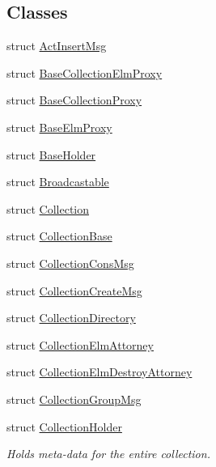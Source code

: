 \subsection*{Classes}
\begin{DoxyCompactItemize}
\item 
struct \hyperlink{structvt_1_1vrt_1_1collection_1_1_act_insert_msg}{Act\+Insert\+Msg}
\item 
struct \hyperlink{structvt_1_1vrt_1_1collection_1_1_base_collection_elm_proxy}{Base\+Collection\+Elm\+Proxy}
\item 
struct \hyperlink{structvt_1_1vrt_1_1collection_1_1_base_collection_proxy}{Base\+Collection\+Proxy}
\item 
struct \hyperlink{structvt_1_1vrt_1_1collection_1_1_base_elm_proxy}{Base\+Elm\+Proxy}
\item 
struct \hyperlink{structvt_1_1vrt_1_1collection_1_1_base_holder}{Base\+Holder}
\item 
struct \hyperlink{structvt_1_1vrt_1_1collection_1_1_broadcastable}{Broadcastable}
\item 
struct \hyperlink{structvt_1_1vrt_1_1collection_1_1_collection}{Collection}
\item 
struct \hyperlink{structvt_1_1vrt_1_1collection_1_1_collection_base}{Collection\+Base}
\item 
struct \hyperlink{structvt_1_1vrt_1_1collection_1_1_collection_cons_msg}{Collection\+Cons\+Msg}
\item 
struct \hyperlink{structvt_1_1vrt_1_1collection_1_1_collection_create_msg}{Collection\+Create\+Msg}
\item 
struct \hyperlink{structvt_1_1vrt_1_1collection_1_1_collection_directory}{Collection\+Directory}
\item 
struct \hyperlink{structvt_1_1vrt_1_1collection_1_1_collection_elm_attorney}{Collection\+Elm\+Attorney}
\item 
struct \hyperlink{structvt_1_1vrt_1_1collection_1_1_collection_elm_destroy_attorney}{Collection\+Elm\+Destroy\+Attorney}
\item 
struct \hyperlink{structvt_1_1vrt_1_1collection_1_1_collection_group_msg}{Collection\+Group\+Msg}
\item 
struct \hyperlink{structvt_1_1vrt_1_1collection_1_1_collection_holder}{Collection\+Holder}
\begin{DoxyCompactList}\small\item\em Holds meta-\/data for the entire collection. \end{DoxyCompactList}\item 

\end{DoxyCompactItemize}

